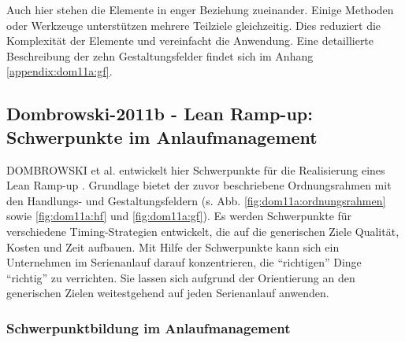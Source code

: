 Auch hier stehen die Elemente in enger Beziehung zueinander. Einige Methoden oder Werkzeuge unterstützen mehrere Teilziele gleichzeitig. Dies reduziert die Komplexität der Elemente und vereinfacht die Anwendung. 
Eine detaillierte Beschreibung der zehn Gestaltungsfelder findet sich im Anhang \ref{appendix:dom11a:gf}. 
% 

\subsection*{Dombrowski-2011b - Lean Ramp-up: Schwerpunkte im Anlaufmanagement}

DOMBROWSKI et al. entwickelt hier Schwerpunkte für die Realisierung eines Lean Ramp-up \autocite{Dombrowski2011b}. Grundlage bietet der zuvor beschriebene Ordnungsrahmen mit den Handlungs- und Gestaltungsfeldern (s. Abb. \ref{fig:dom11a:ordnungsrahmen} sowie \ref{fig:dom11a:hf} und \ref{fig:dom11a:gf}). Es werden Schwerpunkte für verschiedene Timing-Strategien entwickelt, die auf die generischen Ziele Qualität, Kosten und Zeit aufbauen. Mit Hilfe der Schwerpunkte kann sich ein Unternehmen im Serienanlauf darauf konzentrieren, die ``richtigen'' Dinge ``richtig'' zu verrichten. Sie lassen sich aufgrund der Orientierung an den generischen Zielen weitestgehend auf jeden Serienanlauf anwenden. 

\subsubsection{Schwerpunktbildung im Anlaufmanagement}\label{sec:schwerpunktbildung}

